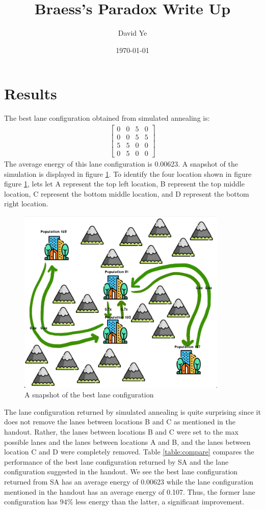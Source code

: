 \documentclass[11pt]{article}
\title{Braess's Paradox Write Up}
\author{David Ye}
\date{\today}
\begin{document}
\maketitle
\section{Results}
The best lane configuration obtained from simulated annealing is:
\begin{align*}
\begin{bmatrix}
0 & 0 & 5 & 0\\
0 & 0 & 5 &5\\
5 & 5 & 0 & 0\\
0 & 5 & 0 & 0
\end{bmatrix}
\end{align*}
The average energy of this lane configuration is 0.00623. A snapshot of the simulation is displayed in figure \ref{fig:snapshot}. To identify the four location shown in figure figure \ref{fig:snapshot}, lets let A represent the top left location, B represent the top middle location, C represent the bottom middle location, and D represent the bottom right location.
\begin{figure}[H]
	\centering
	\includegraphics[width=10cm]{Snapshot.png}
	\caption{\label{fig:snapshot} A snapshot of the best lane configuration}
\end{figure}

The lane configuration returned by simulated annealing is quite surprising since it does not remove the lanes between locations B and C as mentioned in the handout. Rather, the lanes between locations B and C were set to the max possible lanes and the lanes between locations A and B, and the lanes between location C and D were completely removed. Table \ref{table:compare} compares the performance of the best lane configuration returned by SA and the lane configuration suggested in the handout. We see the best lane configuration returned from SA has an average energy of 0.00623 while the lane configuration mentioned in the handout has an average energy of 0.107. Thus, the former lane configuration has $94\%$ less energy than the latter, a significant improvement.
\end{document}
